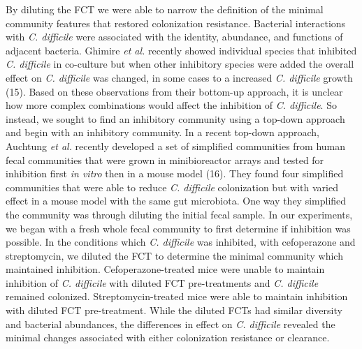 \documentclass[
  12pt,
]{article}
\begin{document}
By diluting the FCT we were able to narrow the definition of the minimal
community features that restored colonization resistance. Bacterial
interactions with \emph{C. difficile} were associated with the identity,
abundance, and functions of adjacent bacteria. Ghimire \emph{et al.}
recently showed individual species that inhibited \emph{C. difficile} in
co-culture but when other inhibitory species were added the overall
effect on \emph{C. difficile} was changed, in some cases to a increased
\emph{C. difficile} growth (15). Based on these observations from their
bottom-up approach, it is unclear how more complex combinations would
affect the inhibition of \emph{C. difficile}. So instead, we sought to
find an inhibitory community using a top-down approach and begin with an
inhibitory community. In a recent top-down approach, Auchtung \emph{et
al.} recently developed a set of simplified communities from human fecal
communities that were grown in minibioreactor arrays and tested for
inhibition first \emph{in vitro} then in a mouse model (16). They found
four simplified communities that were able to reduce \emph{C. difficile}
colonization but with varied effect in a mouse model with the same gut
microbiota. One way they simplified the community was through diluting
the initial fecal sample. In our experiments, we began with a fresh
whole fecal community to first determine if inhibition was possible. In
the conditions which \emph{C. difficile} was inhibited, with
cefoperazone and streptomycin, we diluted the FCT to determine the
minimal community which maintained inhibition. Cefoperazone-treated mice
were unable to maintain inhibition of \emph{C. difficile} with diluted
FCT pre-treatments and \emph{C. difficile} remained colonized.
Streptomycin-treated mice were able to maintain inhibition with diluted
FCT pre-treatment. While the diluted FCTs had similar diversity and
bacterial abundances, the differences in effect on \emph{C. difficile}
revealed the minimal changes associated with either colonization
resistance or clearance.
\end{document}
